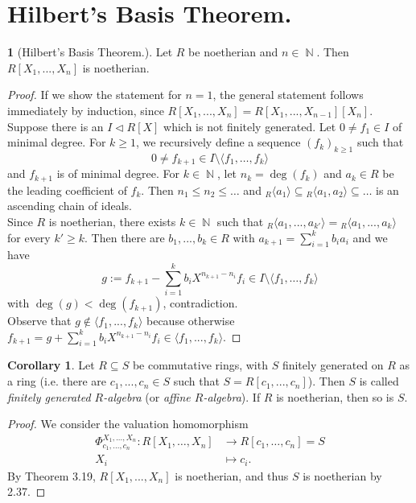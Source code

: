 \documentclass[12pt,a4paper]{report}
\theoremstyle{definition}
\newtheorem{corollary}[theorem]{Corollary} %
\theoremstyle{num.custom-title}
\newtheorem{teo_custom-title}[theorem]{} %
\DeclareMathOperator{\N}{\mathbb{N}}
\DeclareMathOperator{\sm}{\setminus}
\DeclareMathOperator{\sse}{\subseteq}
\begin{document}
\section{Hilbert's Basis Theorem.}

\begin{teo_custom-title}[Hilbert's Basis Theorem.]
Let $R$ be noetherian and $n \in \N$. Then $R[X_1,...,X_n]$ is noetherian.
\begin{proof}
If we show the statement for $n=1$, the general statement follows immediately by induction, since $R[X_1,...,X_n]=R[X_1,...,X_{n-1}][X_n]$. Suppose there is an $I \lhd R[X]$ which is not finitely generated. Let $0 \neq f_1 \in I$ of minimal degree. For $k \geq 1$, we recursively define a sequence $(f_k)_{k \geq 1}$ such that
\[
0 \neq f_{k+1} \in I \sm \langle f_1, \ldots , f_k \rangle
\]
and $f_{k+1}$ is of minimal degree. For $k \in \N$, let $n_k = \deg(f_k)$ and $a_k \in R$ be the leading coefficient of $f_k$. Then $n_1 \leq n_2 \leq \ldots$ and ${}_R \langle a_1 \rangle \sse {}_R \langle a_1,a_2 \rangle \sse \ldots$ is an ascending chain of ideals.\\
Since $R$ is noetherian, there exists $k \in \N$ such that ${}_R \langle a_1,...,a_{k'} \rangle = {}_R \langle a_1,...,a_k \rangle$ for every $k' \geq k$. Then there are $b_1,...,b_k \in R$ with $a_{k+1} = \sum_{i=1}^k b_i a_i$ and we have
\[
g := f_{k+1} - \sum_{i=1}^k b_i X^{n_{k+1}-n_i} f_i \in I \sm \langle f_1, \ldots, f_k \rangle
\]
with $\deg(g) < \deg(f_{k+1})$, contradiction.\\
Observe that $g \not\in \langle f_1,..., f_k \rangle$ because otherwise $f_{k+1} = g + \sum_{i=1}^k b_i X^{n_{k+1}-n_i} f_i \in \langle f_1,...,f_k \rangle$.
\end{proof}
\end{teo_custom-title}

\begin{corollary}
Let $R \sse S$ be commutative rings, with $S$ finitely generated on $R$ as a ring (i.e. there are $c_1,...,c_n \in S$ such that $S=R[c_1,...,c_n]$). Then $S$ is called \emph{finitely generated $R$-algebra} (or \emph{affine $R$-algebra}). If $R$ is noetherian, then so is $S$.
\begin{proof}
We consider the valuation homomorphism
\begin{align*}
\Phi_{c_1,\ldots,c_n}^{X_1,...,X_n} \colon R[X_1,\ldots,X_n] & \to R[c_1,\ldots,c_n]=S \\
X_i & \mapsto c_i.
\end{align*}
By Theorem 3.19, $R[X_1,...,X_n]$ is noetherian, and thus $S$ is noetherian by 2.37.
\end{proof}
\end{corollary}
\end{document}
